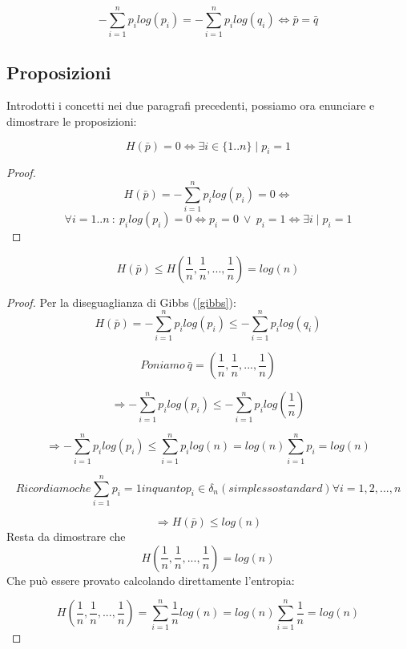 \begin{osservazione}
 \[ -\sum_{i=1}^n p_i log(p_i) = - \sum_{i=1}^n p_i log(q_i) \iff \bar{p}=\bar{q}\]
\end{osservazione}







\subsection{Proposizioni}
Introdotti i concetti nei due paragrafi precedenti, possiamo ora enunciare e dimostrare 
le proposizioni:
\begin{proposizione}
 \[H(\bar{p})=0 \iff \exists i \in \{1..n\} \mid p_i=1  \]

  \begin{proof}
  \[H(\bar{p})=-\sum_{i=1}^{n}p_i log(p_i)=0 \iff \]
  \[ \forall i=1..n \ : \ p_i log(p_i)=0 \iff 
    p_i=0 \ \lor \ p_i=1 \iff \exists i \mid p_i=1 \]
  \end{proof}
\end{proposizione}

\begin{proposizione}
\label{propen}
 \[H(\bar{p}) \le H(\frac{1}{n},\frac{1}{n},...,\frac{1}{n})=log(n)  \]

  \begin{proof}
  Per la diseguaglianza di Gibbs (\ref{gibbs}):
  \[ H(\bar{p})=-\sum_{i=1}^n p_i log(p_i) \le -\sum_{i=1}^n p_i log(q_i)  \]

  \[Poniamo \ \bar{q}=\left ( \frac{1}{n},\frac{1}{n},...,\frac{1}{n} \right) \]

  \[ \Rightarrow -\sum_{i=1}^{n} p_i log(p_i) \le
    -\sum_{i=1}^{n} p_i log \left (\frac{1}{n} \right) \]

  \[ \Rightarrow -\sum_{i=1}^{n} p_i log(p_i) \le
    \sum_{i=1}^{n} p_i log(n) = log(n) \sum_{i=1}^{n} p_i = log(n) \]

  \[Ricordiamo che \sum_{i=1}^{n} p_i = 1 in quanto p_i \in \delta_n (simplesso standard) \forall i = 1, 2, ..., n \]

  \[ \Rightarrow H(\bar{p}) \le log(n) \]
  Resta da dimostrare che \[H(\frac{1}{n},\frac{1}{n},...,\frac{1}{n})=log(n) \]
  Che può essere provato calcolando direttamente l'entropia:

  \[H(\frac{1}{n},\frac{1}{n},...,\frac{1}{n})=\sum_{i=1}^n \frac{1}{n} log(n)=log(n) \sum_{i=1}^n \frac{1}{n}=log(n) \]


  \end{proof}
\end{proposizione}

